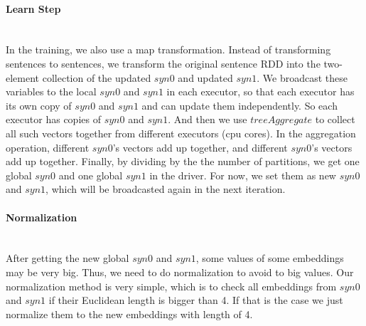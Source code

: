 \paragraph{Learn Step}\ \\
In the training, we also use a map transformation. Instead of transforming sentences to sentences, we transform the original sentence RDD into the two-element collection of the updated $syn0$ and updated $syn1$. We broadcast these variables to the local $syn0$ and $syn1$ in each executor, so that each executor has its own  copy of $syn0$ and $syn1$ and can update them independently. So each executor has copies of $syn0$ and $syn1$. And then we use $treeAggregate$ to collect all such vectors together from different executors (cpu cores).  In the aggregation operation, different $syn0$'s vectors add up together, and different $syn0$'s vectors add up together. Finally, by dividing by the the number of partitions, we get one global $syn0$ and one global $syn1$ in the driver. For now, we set them as new $syn0$ and $syn1$, which will be broadcasted again in the next iteration. 

\paragraph{Normalization}\ \\
After getting the new global $syn0$ and $syn1$, some values of some embeddings may be very big. Thus, we need to do normalization to avoid to big values. Our normalization method is very simple, which is to check all embeddings from $syn0$ and $syn1$ if their Euclidean length is bigger than 4. If that is the case we just normalize them to the new embeddings with length of 4.






